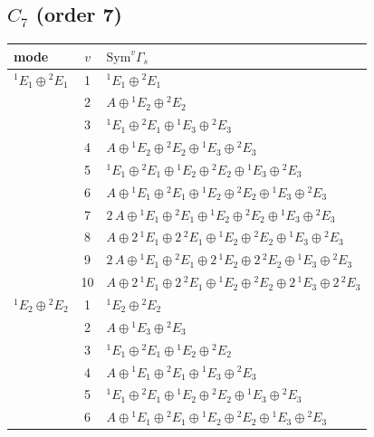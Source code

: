 \documentclass[11pt]{article}
\begin{document}
\subsection*{$C_{7}$ \quad (order 7)}
\begin{longtable}{l c p{}}
\hline mode & $v$ & $\mathrm{Sym}^v\Gamma_s$\\ \hline\endhead
${}^{1}E_{1}\oplus {}^{2}E_{1}$ & 1 & ${}^{1}E_{1}\oplus {}^{2}E_{1}$\\
 & 2 & $A\oplus {}^{1}E_{2}\oplus {}^{2}E_{2}$\\
 & 3 & ${}^{1}E_{1}\oplus {}^{2}E_{1}\oplus {}^{1}E_{3}\oplus {}^{2}E_{3}$\\
 & 4 & $A\oplus {}^{1}E_{2}\oplus {}^{2}E_{2}\oplus {}^{1}E_{3}\oplus {}^{2}E_{3}$\\
 & 5 & ${}^{1}E_{1}\oplus {}^{2}E_{1}\oplus {}^{1}E_{2}\oplus {}^{2}E_{2}\oplus {}^{1}E_{3}\oplus {}^{2}E_{3}$\\
 & 6 & $A\oplus {}^{1}E_{1}\oplus {}^{2}E_{1}\oplus {}^{1}E_{2}\oplus {}^{2}E_{2}\oplus {}^{1}E_{3}\oplus {}^{2}E_{3}$\\
 & 7 & $2\,A\oplus {}^{1}E_{1}\oplus {}^{2}E_{1}\oplus {}^{1}E_{2}\oplus {}^{2}E_{2}\oplus {}^{1}E_{3}\oplus {}^{2}E_{3}$\\
 & 8 & $A\oplus 2\,{}^{1}E_{1}\oplus 2\,{}^{2}E_{1}\oplus {}^{1}E_{2}\oplus {}^{2}E_{2}\oplus {}^{1}E_{3}\oplus {}^{2}E_{3}$\\
 & 9 & $2\,A\oplus {}^{1}E_{1}\oplus {}^{2}E_{1}\oplus 2\,{}^{1}E_{2}\oplus 2\,{}^{2}E_{2}\oplus {}^{1}E_{3}\oplus {}^{2}E_{3}$\\
 & 10 & $A\oplus 2\,{}^{1}E_{1}\oplus 2\,{}^{2}E_{1}\oplus {}^{1}E_{2}\oplus {}^{2}E_{2}\oplus 2\,{}^{1}E_{3}\oplus 2\,{}^{2}E_{3}$\\
\hline
${}^{1}E_{2}\oplus {}^{2}E_{2}$ & 1 & ${}^{1}E_{2}\oplus {}^{2}E_{2}$\\
 & 2 & $A\oplus {}^{1}E_{3}\oplus {}^{2}E_{3}$\\
 & 3 & ${}^{1}E_{1}\oplus {}^{2}E_{1}\oplus {}^{1}E_{2}\oplus {}^{2}E_{2}$\\
 & 4 & $A\oplus {}^{1}E_{1}\oplus {}^{2}E_{1}\oplus {}^{1}E_{3}\oplus {}^{2}E_{3}$\\
 & 5 & ${}^{1}E_{1}\oplus {}^{2}E_{1}\oplus {}^{1}E_{2}\oplus {}^{2}E_{2}\oplus {}^{1}E_{3}\oplus {}^{2}E_{3}$\\
 & 6 & $A\oplus {}^{1}E_{1}\oplus {}^{2}E_{1}\oplus {}^{1}E_{2}\oplus {}^{2}E_{2}\oplus {}^{1}E_{3}\oplus {}^{2}E_{3}$\\

\end{longtable}
\end{document}
